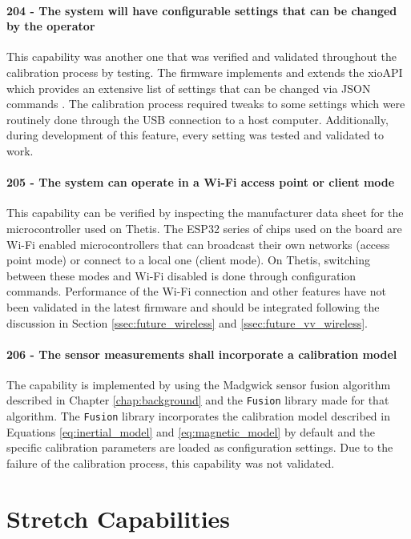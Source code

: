 \paragraph*{204 - The system will have configurable settings that can be changed by the operator} This capability was another one that was verified and validated throughout the calibration process by testing.
The firmware implements and extends the xioAPI which provides an extensive list of settings that can be changed via JSON commands \cite{ThetisUserManual}.
The calibration process required tweaks to some settings which were routinely done through the USB connection to a host computer.
Additionally, during development of this feature, every setting was tested and validated to work.

\paragraph*{205 - The system can operate in a Wi-Fi access point or client mode} This capability can be verified by inspecting the manufacturer data sheet for the microcontroller used on Thetis.
The ESP32 series of chips used on the board are Wi-Fi enabled microcontrollers that can broadcast their own networks (access point mode) or connect to a local one (client mode).
On Thetis, switching between these modes and Wi-Fi disabled is done through configuration commands.
Performance of the Wi-Fi connection and other features have not been validated in the latest firmware and should be integrated following the discussion in Section \ref{ssec:future_wireless} and \ref{ssec:future_vv_wireless}.

\paragraph*{206 - The sensor measurements shall incorporate a calibration model} The capability is implemented by using the Madgwick sensor fusion algorithm described in Chapter \ref{chap:background} and the \lstinline[style=customInline]|Fusion| library made for that algorithm.
The \lstinline[style=customInline]|Fusion| library incorporates the calibration model described in Equations \ref{eq:inertial_model} and \ref{eq:magnetic_model} by default and the specific calibration parameters are loaded as configuration settings.
Due to the failure of the calibration process, this capability was not validated.

\section{Stretch Capabilities}

